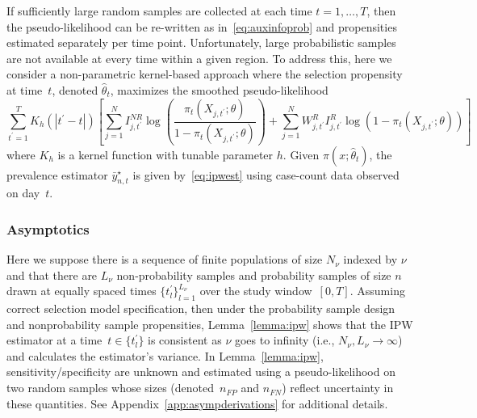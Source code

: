 \documentclass[11pt]{amsart}
\numberwithin{equation}{section}
\theoremstyle{plain}
\begin{document}
 If sufficiently large random samples are collected at each time $t =1,\ldots,T$, then the pseudo-likelihood can be re-written as in~\eqref{eq:auxinfoprob} and propensities estimated separately per time point.  Unfortunately, large probabilistic samples are not available at every time within a given region.  To address this, here we consider a non-parametric kernel-based approach where the selection propensity at time~$t$, denoted $\hat \theta_t$, maximizes the smoothed pseudo-likelihood
 $$
 \sum_{t^\prime=1}^T K_h(|t^\prime - t|) \left[ \sum_{j=1}^N I_{j,t^\prime}^{NR} \log \left( \frac{\pi_t (X_{j,t^\prime}; \theta)}{1-\pi_t(X_{j,t^\prime}; \theta)} \right) + \sum_{j=1}^N W^{R}_{j,t^\prime} I^R_{j,t^\prime} \log \left( 1 - \pi_t (X_{j,t^\prime}; \theta) \right) \right]
 $$
 where $K_h$ is a kernel function with tunable parameter $h$. Given $\pi (x;\hat \theta_t)$, the prevalence estimator $\bar y_{n,t}^\star$ is given by~\ref{eq:ipwest} using case-count data observed on day~$t$.

 \subsubsection{Asymptotics}
 \label{section:asymptotics}

 Here we suppose there is a sequence of finite populations of size $N_{\nu}$ indexed by $\nu$ and that there are $L_\nu$ non-probability samples and probability samples of size $n$ drawn at equally spaced times $\{ t^\prime_l \}_{l=1}^{L_{\nu}}$ over the study window~$[0,T]$. Assuming correct selection model specification, then under the probability sample design and nonprobability sample propensities, Lemma~\ref{lemma:ipw} shows that the IPW estimator at a time~$t \in \{ t^\prime_l \}$ is consistent as $\nu$ goes to infinity (i.e., $N_{\nu}, L_{\nu} \to \infty$) and calculates the estimator's variance.  In Lemma~\ref{lemma:ipw}, sensitivity/specificity are unknown and estimated using a pseudo-likelihood on two random samples whose sizes (denoted~$n_{FP}$ and $n_{FN}$) reflect uncertainty in these quantities.  See Appendix~\ref{app:asympderivations} for additional details.
\end{document}
